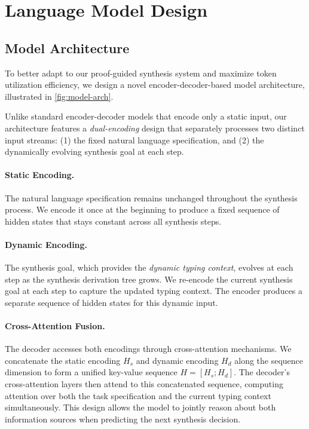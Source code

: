 \section{Language Model Design}
\label{sec:implementation}

\subsection{Model Architecture}
To better adapt to our proof-guided synthesis system and maximize token utilization efficiency, we design a novel encoder-decoder-based model architecture, illustrated in \autoref{fig:model-arch}.

Unlike standard encoder-decoder models that encode only a static input, our architecture features a \emph{dual-encoding} design that separately processes two distinct input streams: (1) the fixed natural language specification, and (2) the dynamically evolving synthesis goal at each step.

\paragraph{Static Encoding.} The natural language specification remains unchanged throughout the synthesis process. We encode it once at the beginning to produce a fixed sequence of hidden states that stays constant across all synthesis steps.

\paragraph{Dynamic Encoding.} The synthesis goal, which provides the \emph{dynamic typing context}, evolves at each step as the synthesis derivation tree grows. We re-encode the current synthesis goal at each step to capture the updated typing context. The encoder produces a separate sequence of hidden states for this dynamic input.

\paragraph{Cross-Attention Fusion.} The decoder accesses both encodings through cross-attention mechanisms. We concatenate the static encoding $H_s$ and dynamic encoding $H_d$ along the sequence dimension to form a unified key-value sequence $H = [H_s; H_d]$. The decoder's cross-attention layers then attend to this concatenated sequence, computing attention over both the task specification and the current typing context simultaneously. This design allows the model to jointly reason about both information sources when predicting the next synthesis decision.

